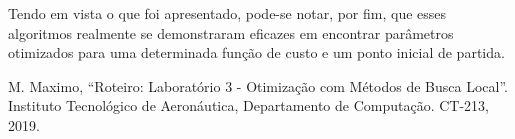 \documentclass[conference]{IEEEtran}
\begin{document}
Tendo em vista o que foi apresentado, pode-se notar, por fim, que esses algoritmos realmente se demonstraram eficazes em encontrar parâmetros otimizados para uma determinada função de custo e um ponto inicial de partida.

\begin{thebibliography}{00}
 M. Maximo, ``Roteiro: Laboratório 3 - Otimização com Métodos de Busca Local''. Instituto Tecnológico de Aeronáutica, Departamento de Computação. CT-213, 2019.
\end{thebibliography}
\end{document}
